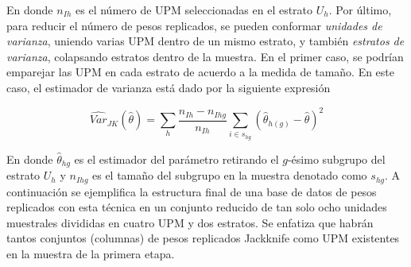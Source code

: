 \documentclass[
  12pt,
]{book}
\begin{document}
En donde \(n_{Ih}\) es el número de UPM seleccionadas en el estrato \(U_h\). Por último, para reducir el número de pesos replicados, se pueden conformar \emph{unidades de varianza}, uniendo varias UPM dentro de un mismo estrato, y también \emph{estratos de varianza}, colapsando estratos dentro de la muestra. En el primer caso, se podrían emparejar las UPM en cada estrato de acuerdo a la medida de tamaño. En este caso, el estimador de varianza está dado por la siguiente expresión

\[
\widehat{Var}_{JK}(\hat{\theta}) = \sum_h \frac{n_{Ih}-n_{Ihg}}{n_{Ih}} 
\sum_{i \in s_{hg}} (\hat{\theta}_{h(g)} - \hat{\theta})^2
\]

En donde \(\hat{\theta}_{hg}\) es el estimador del parámetro retirando el \(g\)-ésimo subgrupo del estrato \(U_h\) y \(n_{Ihg}\) es el tamaño del subgrupo en la muestra denotado como \(s_{hg}\). A continuación se ejemplifica la estructura final de una base de datos de pesos replicados con esta técnica en un conjunto reducido de tan solo ocho unidades muestrales divididas en cuatro UPM y dos estratos. Se enfatiza que habrán tantos conjuntos (columnas) de pesos replicados Jackknife como UPM existentes en la muestra de la primera etapa.
\end{document}
